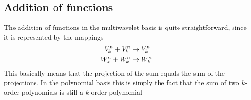 \subsection{Addition of functions}
The addition of functions in the multiwavelet basis is quite straightforward, 
since it is represented by the mappings
\begin{align}
    \label{eq:addmap}
    \begin{split}
	{V}_{k}^{n} + {V}_{k}^{n} &\rightarrow {V}_{k}^{n}\\
	{W}_{k}^{n} + {W}_{k}^{n} &\rightarrow {W}_{k}^{n}
    \end{split}
\end{align}
This basically means that the projection of the sum equals the sum of the
projections. In the polynomial basis this is simply the fact that the sum of
two $k$-order polynomials is still a $k$-order polynomial.

